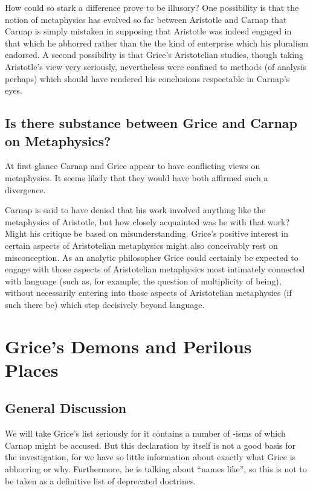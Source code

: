 \documentclass[10pt,titlepage]{book}
\begin{document}
How could so stark a difference prove to be illusory?
One possibility is that the notion of metaphysics has evolved so far between Aristotle and Carnap that Carnap is simply mistaken in supposing that Aristotle was indeed engaged in that which he abhorred rather than the the kind of enterprise which his pluralism endorsed.
A second possibility is that Grice's Aristotelian studies, though taking Aristotle's view very seriously, nevertheless were confined to methods (of analysis perhaps) which should have rendered his conclusions respectable in Carnap's eyes.


\subsection{Is there substance between Grice and Carnap on Metaphysics?}

At first glance Carnap and Grice appear to have conflicting views on metaphysics.
It seems likely that they would have both affirmed such a divergence.

Carnap is said to have denied that his work involved anything like the metaphysics of Aristotle, but how closely acquainted was he with that work?
Might his critique be based on misunderstanding.
Grice's positive interest in certain aspects of Aristotelian metaphysics might also conceivably rest on misconception.
As an analytic philosopher Grice could certainly be expected to engage with those aspects of Aristotelian metaphysics most intimately connected with language (such as, for example, the question of multiplicity of being), without necessarily entering into those aspects of Aristotelian metaphysics (if such there be) which step decisively beyond language.

\section{Grice's Demons and Perilous Places}

\subsection{General Discussion}

We will take Grice's list seriously for it contains a number of -isms of which Carnap might be accused.
But this declaration by itself is not a good basis for the investigation, for we have so little information about exactly what Grice is abhorring or why.
Furthermore, he is talking about ``names like'', so this is not to be taken as a definitive list of deprecated doctrines.
\end{document}
